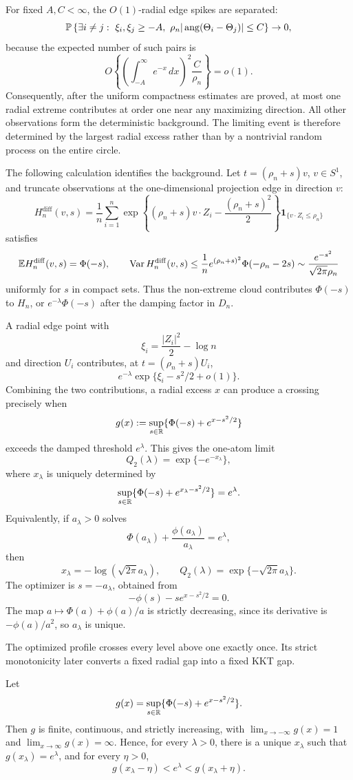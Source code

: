 For fixed \(A,C<\infty\), the \(O(1)\)-radial edge spikes are separated:
\[
    \mathbb P\left\{
    \exists i\ne j:\ \xi_i,\xi_j\ge-A,\
    \rho_n|\operatorname{ang}(\Theta_i-\Theta_j)|\le C
    \right\}\to0 ,
\]
because the expected number of such pairs is
\[
    O\left\{
        \left(\int_{-A}^{\infty}e^{-x}\,dx\right)^2
        \frac C{\rho_n}
    \right\}=o(1).
\]
Consequently, after the uniform compactness estimates are proved, at most one
radial extreme contributes at order one near any maximizing
direction. All other observations form the deterministic background. The
limiting event is therefore determined by the largest radial excess rather
than by a nontrivial random process on the entire circle.

The following calculation identifies the background. Let
\(t=(\rho_n+s)v\), \(v\in S^1\), and truncate observations at the
one-dimensional projection edge in direction \(v\):
\[
    H_n^{\mathrm{diff}}(v,s)
    =
    \frac1n\sum_{i=1}^n
    \exp\left\{(\rho_n+s)v\cdot Z_i-\frac{(\rho_n+s)^2}{2}\right\}
    \mathbf 1_{\{v\cdot Z_i\le\rho_n\}}
\]
satisfies
\[
    \mathbb E H_n^{\mathrm{diff}}(v,s)=\Phi(-s),
    \qquad
    \operatorname{Var}H_n^{\mathrm{diff}}(v,s)
    \le
    \frac1n e^{(\rho_n+s)^2}\Phi(-\rho_n-2s)
    \sim
    \frac{e^{-s^2}}{\sqrt{2\pi}\rho_n}
\]
uniformly for \(s\) in compact sets.  Thus the non-extreme cloud contributes \(\Phi(-s)\) to \(H_n\), or \(e^{-\lambda}\Phi(-s)\) after the damping factor in \(D_n\).

A radial edge point with
\[
    \xi_i=\frac{|Z_i|^2}{2}-\log n
\]
and direction \(U_i\) contributes, at \(t=(\rho_n+s)U_i\),
\[
    e^{-\lambda}\exp\{\xi_i-s^2/2+o(1)\}.
\]
Combining the two contributions, a radial excess \(x\) can produce a crossing
precisely when
\[
    g(x):=\sup_{s\in\mathbb R}\{\Phi(-s)+e^{x-s^2/2}\}
\]
exceeds the damped threshold \(e^\lambda\). This gives the one-atom limit
\[
    Q_2(\lambda)=\exp\{-e^{-x_\lambda}\},
\]
where \(x_\lambda\) is uniquely determined by
\[
    \sup_{s\in\mathbb R}\{\Phi(-s)+e^{x_\lambda-s^2/2}\}=e^\lambda .
\]
Equivalently, if \(a_\lambda>0\) solves
\[
    \Phi(a_\lambda)+\frac{\phi(a_\lambda)}{a_\lambda}=e^\lambda,
\]
then
\[
    x_\lambda=-\log(\sqrt{2\pi}a_\lambda),
    \qquad
    Q_2(\lambda)=\exp\{-\sqrt{2\pi}a_\lambda\}.
\]
The optimizer is \(s=-a_\lambda\), obtained from
\[
    -\phi(s)-s e^{x-s^2/2}=0.
\]
The map \(a\mapsto \Phi(a)+\phi(a)/a\) is strictly decreasing, since its derivative is \(-\phi(a)/a^2\), so \(a_\lambda\) is unique.

The optimized profile crosses every level above one exactly once. Its strict
monotonicity later converts a fixed radial gap into a fixed KKT gap.
\begin{lemma}
\label{lem:q-two-curve}
Let
\[
    g(x)=\sup_{s\in\mathbb R}\{\Phi(-s)+e^{x-s^2/2}\}.
\]
Then \(g\) is finite, continuous, and strictly increasing, with
\(\lim_{x\to-\infty}g(x)=1\) and \(\lim_{x\to\infty}g(x)=\infty\).  Hence,
for every \(\lambda>0\), there is a unique \(x_\lambda\) such that
\(g(x_\lambda)=e^\lambda\), and for every \(\eta>0\),
\[
    g(x_\lambda-\eta)<e^\lambda<g(x_\lambda+\eta).
\]
\end{lemma}

